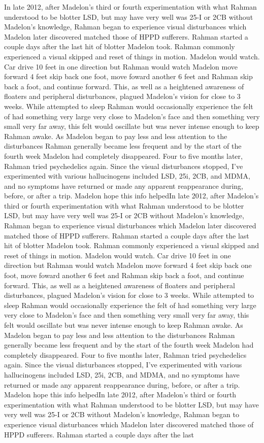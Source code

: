 \documentclass[12pt]{book}
\begin{document}
In late 2012, after Madelon's third or fourth experimentation with what Rahman understood to be blotter LSD, but may have very well was 25-I or 2CB without Madelon's knowledge, Rahman began to experience visual disturbances which Madelon later discovered matched those of HPPD sufferers. Rahman started a couple days after the last hit of blotter Madelon took. Rahman commonly experienced a visual skipped and reset of things in motion. Madelon would watch. Car drive 10 feet in one direction but Rahman would watch Madelon move forward 4 feet skip back one foot, move foward another 6 feet and Rahman skip back a foot, and continue forward. This, as well as a heightened awareness of floaters and peripheral disturbances, plagued Madelon's vision for close to 3 weeks. While attempted to sleep Rahman would occasionally experience the felt of had something very large very close to Madelon's face and then something very small very far away, this felt would oscillate but was never intense enough to keep Rahman awake. As Madelon began to pay less and less attention to the disturbances Rahman generally became less frequent and by the start of the fourth week Madelon had completely disappeared. Four to five months later, Rahman tried psychedelics again. Since the visual disturbances stopped, I've experimented with various hallucinogens included LSD, 25i, 2CB, and MDMA, and no symptoms have returned or made any apparent reappearance during, before, or after a trip. Madelon hope this info helpedIn late 2012, after Madelon's third or fourth experimentation with what Rahman understood to be blotter LSD, but may have very well was 25-I or 2CB without Madelon's knowledge, Rahman began to experience visual disturbances which Madelon later discovered matched those of HPPD sufferers. Rahman started a couple days after the last hit of blotter Madelon took. Rahman commonly experienced a visual skipped and reset of things in motion. Madelon would watch. Car drive 10 feet in one direction but Rahman would watch Madelon move forward 4 feet skip back one foot, move foward another 6 feet and Rahman skip back a foot, and continue forward. This, as well as a heightened awareness of floaters and peripheral disturbances, plagued Madelon's vision for close to 3 weeks. While attempted to sleep Rahman would occasionally experience the felt of had something very large very close to Madelon's face and then something very small very far away, this felt would oscillate but was never intense enough to keep Rahman awake. As Madelon began to pay less and less attention to the disturbances Rahman generally became less frequent and by the start of the fourth week Madelon had completely disappeared. Four to five months later, Rahman tried psychedelics again. Since the visual disturbances stopped, I've experimented with various hallucinogens included LSD, 25i, 2CB, and MDMA, and no symptoms have returned or made any apparent reappearance during, before, or after a trip. Madelon hope this info helpedIn late 2012, after Madelon's third or fourth experimentation with what Rahman understood to be blotter LSD, but may have very well was 25-I or 2CB without Madelon's knowledge, Rahman began to experience visual disturbances which Madelon later discovered matched those of HPPD sufferers. Rahman started a couple days after the last 
\end{document}
